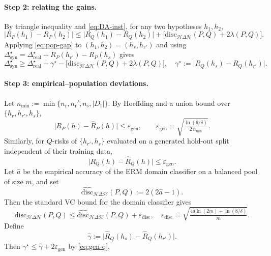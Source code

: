 \paragraph{Step 2: relating the gains.}
By triangle inequality and \eqref{eq:DA-inst}, for any two hypotheses $h_1,h_2$,
\begin{equation}
\bigl|R_P(h_1)-R_P(h_2)\bigr|
\le \bigl|R_Q(h_1)-R_Q(h_2)\bigr|
+\bigl[\mathrm{disc}_{\mathcal H\Delta\mathcal H}(P,Q)+2\lambda(P,Q)\bigr].
\tag{A.5}\label{eq:pop-gap}
\end{equation}
Applying \eqref{eq:pop-gap} to $(h_1,h_2)=(h_s,h_{r'})$ and using
$\Delta^\star_{\text{syn}}=\Delta^\star_{\text{real}}+R_P(h_{r'})-R_P(h_s)$ gives
\begin{equation}
\Delta^\star_{\text{syn}}
\ge \Delta^\star_{\text{real}}
-\gamma^\star
-\bigl[\mathrm{disc}_{\mathcal H\Delta\mathcal H}(P,Q)+2\lambda(P,Q)\bigr],
\quad
\gamma^\star:=\bigl|R_Q(h_s)-R_Q(h_{r'})\bigr|.
\tag{A.6}\label{eq:pop-gap-final}
\end{equation}

\paragraph{Step 3: empirical--population deviations.}
Let $n_{\min}:=\min\{n_{\mathrm r},n_{\mathrm r}',n_{\mathrm s},|D_{\mathrm t}|\}$. By Hoeffding and a union bound over $\{h_r,h_{r'},h_s\}$,
\begin{equation}
\bigl|R_P(h)-\hat R_P(h)\bigr| \le \varepsilon_{\mathrm{gen}},
\qquad
\varepsilon_{\mathrm{gen}}=\sqrt{\tfrac{\ln(6/\delta)}{2\,n_{\min}}}.
\tag{A.7}\label{eq:gen}
\end{equation}
Similarly, for $Q$-risks of $\{h_{r'},h_s\}$ evaluated on a generated hold-out split independent of their training data,
\begin{equation}
\bigl|R_Q(h)-\hat R_Q(h)\bigr| \le \varepsilon_{\mathrm{gen}}.
\tag{A.8}\label{eq:gen-q}
\end{equation}
Let $\hat a$ be the empirical accuracy of the ERM domain classifier on a balanced pool of size $m$, and set
\[
\widehat{\mathrm{disc}}_{\mathcal H\Delta\mathcal H}(P,Q):=2(2\hat a-1).
\]
Then the standard VC bound for the domain classifier gives
\begin{equation}
\mathrm{disc}_{\mathcal H\Delta\mathcal H}(P,Q)
\le \widehat{\mathrm{disc}}_{\mathcal H\Delta\mathcal H}(P,Q)+\varepsilon_{\mathrm{disc}},
\quad
\varepsilon_{\mathrm{disc}}=\sqrt{\tfrac{4d\ln(2m)+\ln(8/\delta)}{m}}.
\tag{A.9}\label{eq:disc}
\end{equation}
Define
\[
\hat\gamma:=\bigl|\hat R_Q(h_s)-\hat R_Q(h_{r'})\bigr|.
\]
Then $\gamma^\star\le \hat\gamma+2\varepsilon_{\mathrm{gen}}$ by \eqref{eq:gen-q}.

